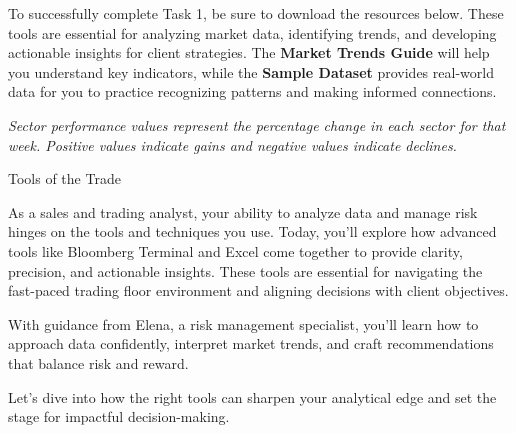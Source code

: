 \documentclass[11pt]{article}
\begin{document}

To successfully complete Task 1, be sure to download the resources below.
These tools are essential for analyzing market data, identifying trends, and
developing actionable insights for client strategies. The \textbf{Market
Trends Guide} will help you understand key indicators, while the
\textbf{Sample Dataset} provides real-world data for you to practice
recognizing patterns and making informed connections.\par\medskip


\medskip
\textit{Sector performance values represent the percentage change in each
sector for that week. Positive values indicate gains and negative values
indicate declines.}

\newpage
{\fontsize{26}{30}\selectfont Tools of the Trade}\par\bigskip

As a sales and trading analyst, your ability to analyze data and manage risk
hinges on the tools and techniques you use. Today, you'll explore how advanced
tools like Bloomberg Terminal and Excel come together to provide clarity,
precision, and actionable insights. These tools are essential for navigating
the fast-paced trading floor environment and aligning decisions with client
objectives.

With guidance from Elena, a risk management specialist, you'll learn how to
approach data confidently, interpret market trends, and craft recommendations
that balance risk and reward.


Let's dive into how the right tools can sharpen your analytical edge and set
the stage for impactful decision-making.

\end{document}
